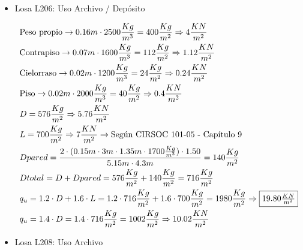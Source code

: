 \begin{enumerate}
\begin{itemize}
\newpage
\item Losa L206: Uso Archivo / Depósito

\begin{align*}
& \text{Peso propio} \rightarrow 0.16m \cdot 2500 \frac{Kg}{m^3} = 400 \frac{Kg}{m^2} \Rightarrow 4 \frac{KN}{m^2} \\
& \text{Contrapiso} \rightarrow 0.07m \cdot 1600 \frac{Kg}{m^3} = 112 \frac{Kg}{m^2} \Rightarrow 1.12 \frac{KN}{m^2} \\
& \text{Cielorraso} \rightarrow 0.02m \cdot 1200 \frac{Kg}{m^3} = 24 \frac{Kg}{m^2} \Rightarrow 0.24 \frac{KN}{m^2} \\
& \text{Piso} \rightarrow 0.02m \cdot 2000 \frac{Kg}{m^3} = 40 \frac{Kg}{m^2} \Rightarrow 0.4 \frac{KN}{m^2} \\
& D = 576 \frac{Kg}{m^2} \Rightarrow 5.76 \frac{KN}{m^2} \\
& L = 700 \frac{Kg}{m^2} \Rightarrow 7 \frac{KN}{m^2} \rightarrow \text{Según CIRSOC 101-05 - Capítulo 9}\\
& Dpared = \frac{2 \cdot (0.15m \cdot 3m \cdot 1.35m \cdot 1700 \frac{Kg}{m^3}) \cdot 1.50}{5.15m \cdot 4.3m} = 140 \frac{Kg}{m^2} \\
& Dtotal = D + Dpared = 576 \frac{Kg}{m^2} + 140 \frac{Kg}{m^2} = 716 \frac{Kg}{m^2} \\
& q_u = 1.2 \cdot D + 1.6 \cdot L = 1.2 \cdot 716 \frac{Kg}{m^2} + 1.6 \cdot 700 \frac{Kg}{m^2} = 1980 \frac{Kg}{m^2} \Rightarrow \framebox{$19.80 \frac{KN}{m^2}$} \\
& q_u = 1.4 \cdot D = 1.4 \cdot 716 \frac{Kg}{m^2} = 1002 \frac{Kg}{m^2} \Rightarrow 10.02 \frac{KN}{m^2}
\end{align*}

\item Losa L208: Uso Archivo


\end{itemize}
\end{enumerate}
